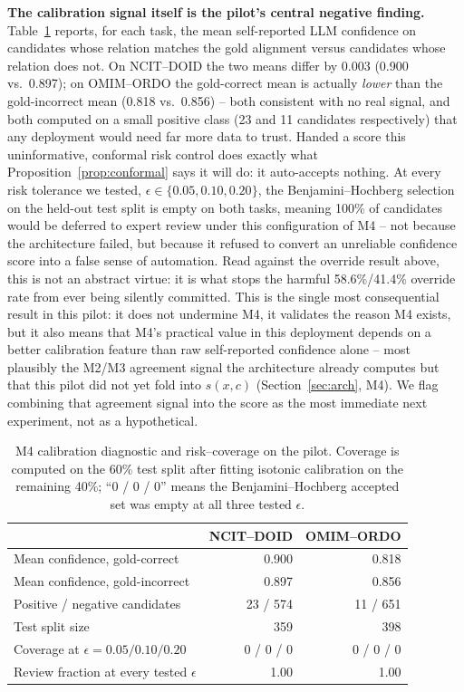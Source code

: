 \documentclass[conference]{IEEEtran}
\begin{document}
\textbf{The calibration signal itself is the pilot's central negative finding.} Table~\ref{tab:m4} reports, for each task, the mean self-reported LLM confidence on candidates whose relation matches the gold alignment versus candidates whose relation does not. On NCIT--DOID the two means differ by 0.003 (0.900 vs.\ 0.897); on OMIM--ORDO the gold-correct mean is actually \emph{lower} than the gold-incorrect mean (0.818 vs.\ 0.856) -- both consistent with no real signal, and both computed on a small positive class (23 and 11 candidates respectively) that any deployment would need far more data to trust. Handed a score this uninformative, conformal risk control does exactly what Proposition~\ref{prop:conformal} says it will do: it auto-accepts nothing. At every risk tolerance we tested, $\epsilon \in \{0.05, 0.10, 0.20\}$, the Benjamini--Hochberg selection on the held-out test split is empty on both tasks, meaning 100\% of candidates would be deferred to expert review under this configuration of M4 -- not because the architecture failed, but because it refused to convert an unreliable confidence score into a false sense of automation. Read against the override result above, this is not an abstract virtue: it is what stops the harmful 58.6\%/41.4\% override rate from ever being silently committed. This is the single most consequential result in this pilot: it does not undermine M4, it validates the reason M4 exists, but it also means that M4's practical value in this deployment depends on a better calibration feature than raw self-reported confidence alone -- most plausibly the M2/M3 agreement signal the architecture already computes but that this pilot did not yet fold into $s(x,c)$ (Section~\ref{sec:arch}, M4). We flag combining that agreement signal into the score as the most immediate next experiment, not as a hypothetical.

\begin{table}[t]
\caption{M4 calibration diagnostic and risk--coverage on the pilot. Coverage is computed on the 60\% test split after fitting isotonic calibration on the remaining 40\%; ``0 / 0 / 0'' means the Benjamini--Hochberg accepted set was empty at all three tested $\epsilon$.}
\label{tab:m4}
\centering
\footnotesize
\begin{tabular}{@{}lrr@{}}
\toprule
 & \textbf{NCIT--DOID} & \textbf{OMIM--ORDO} \\
\midrule
Mean confidence, gold-correct & 0.900 & 0.818 \\
Mean confidence, gold-incorrect & 0.897 & 0.856 \\
Positive / negative candidates & 23 / 574 & 11 / 651 \\
Test split size & 359 & 398 \\
Coverage at $\epsilon{=}0.05/0.10/0.20$ & 0 / 0 / 0 & 0 / 0 / 0 \\
Review fraction at every tested $\epsilon$ & 1.00 & 1.00 \\
\bottomrule
\end{tabular}
\end{table}
\end{document}
